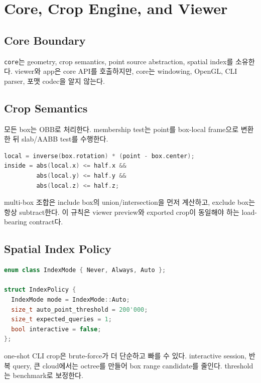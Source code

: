 \chapter{Core, Crop Engine, and Viewer}

\section{Core Boundary}

\texttt{core}는 geometry, crop semantics, point source abstraction, spatial
index를 소유한다. viewer와 app은 core API를 호출하지만, core는 windowing,
OpenGL, CLI parser, 포맷 codec을 알지 않는다.

\section{Crop Semantics}

모든 box는 OBB로 처리한다. membership test는 point를 box-local frame으로
변환한 뒤 slab/AABB test를 수행한다.

\begin{lstlisting}[language=C++]
local = inverse(box.rotation) * (point - box.center);
inside = abs(local.x) <= half.x &&
         abs(local.y) <= half.y &&
         abs(local.z) <= half.z;
\end{lstlisting}

multi-box 조합은 include box의 union/intersection을 먼저 계산하고, exclude box는
항상 subtract한다. 이 규칙은 viewer preview와 exported crop이 동일해야 하는
load-bearing contract다.

\section{Spatial Index Policy}

\begin{lstlisting}[language=C++]
enum class IndexMode { Never, Always, Auto };

struct IndexPolicy {
  IndexMode mode = IndexMode::Auto;
  size_t auto_point_threshold = 200'000;
  size_t expected_queries = 1;
  bool interactive = false;
};
\end{lstlisting}

one-shot CLI crop은 brute-force가 더 단순하고 빠를 수 있다. interactive session,
반복 query, 큰 cloud에서는 octree를 만들어 box range candidate를 줄인다.
threshold는 benchmark로 보정한다.

